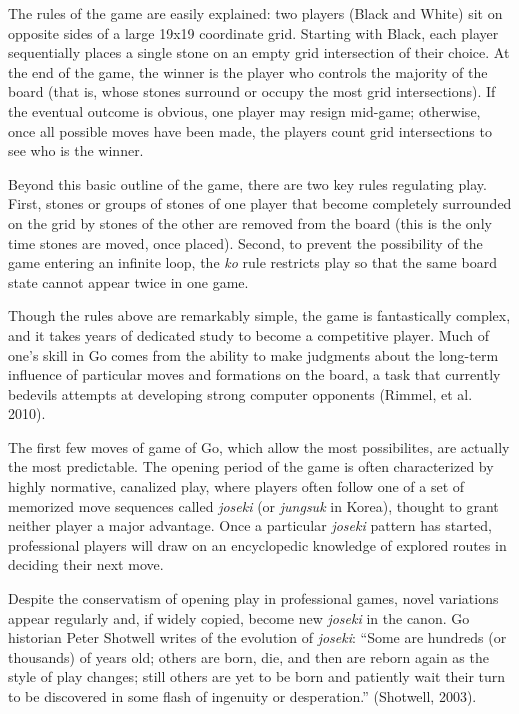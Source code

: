 \documentclass{article}
\begin{document}
The rules of the game are easily explained: two players (Black and White) sit on opposite sides of a large 19x19 coordinate grid.  Starting with Black, each player sequentially places a single stone on an empty grid intersection of their choice.  At the end of the game, the winner is the player who controls the majority of the board (that is, whose stones surround or occupy the most grid intersections).  If the eventual outcome is obvious, one player may resign mid-game; otherwise, once all possible moves have been made, the players count grid intersections to see who is the winner.

Beyond this basic outline of the game, there are two key rules regulating play.  First, stones or groups of stones of one player that become completely surrounded on the grid by stones of the other are removed from the board (this is the only time stones are moved, once placed).  Second, to prevent the possibility of the game entering an infinite loop, the \textit{ko} rule restricts play so that the same board state cannot appear twice in one game.

Though the rules above are remarkably simple, the game is fantastically complex, and it takes years of dedicated study to become a competitive player.  Much of one's skill in Go comes from the ability to make judgments about the long-term influence of particular moves and formations on the board, a task that currently bedevils attempts at developing strong computer opponents (Rimmel, et al. 2010). 

The first few moves of game of Go, which allow the most possibilites, are actually the most predictable.  The opening period of the game is often characterized by highly normative, canalized play, where players often follow one of a set of memorized move sequences called \textit{joseki} (or \textit{jungsuk} in Korea), thought to grant neither player a major advantage.  Once a particular \textit{joseki} pattern has started, professional players will draw on an encyclopedic knowledge of explored routes in deciding their next move.

Despite the conservatism of opening play in professional games, novel variations appear regularly and, if widely copied, become new \textit{joseki} in the canon.  Go historian Peter Shotwell writes of the evolution of \textit{joseki}: ``Some are hundreds (or thousands) of years old; others are born, die, and then are reborn again as the style of play changes; still others are yet to be born and patiently wait their turn to be discovered in some flash of ingenuity or desperation.'' (Shotwell, 2003).
\end{document}
